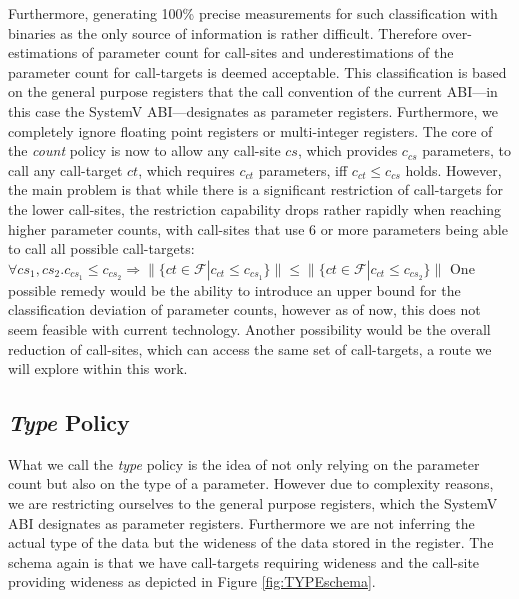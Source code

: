  Furthermore, generating 100\% precise measurements for such classification with binaries as the only source of information is rather difficult. 
 Therefore over-estimations of parameter count for call-sites and underestimations of the parameter count for call-targets is deemed acceptable. 
 This classification is based on the general purpose registers that the call convention of the current ABI---in this case the 
 SystemV ABI---designates as parameter registers. Furthermore, we completely ignore floating point registers or multi-integer registers. 
 The core of the \emph{count} policy is now to allow any call-site $cs$, which provides $c_{cs}$ parameters, to call any call-target $ct$, 
 which requires $c_{ct}$ parameters, iff $c_{ct} \leq c_{cs}$ holds. However, the main problem is that while there is a significant 
 restriction of call-targets for the lower call-sites, the restriction capability drops rather rapidly when reaching higher parameter 
 counts, with call-sites that use 6 or more parameters being able to call all possible call-targets:
$
	\forall cs_1, cs_2.  c_{cs_1} \leq c_{cs_2} \Longrightarrow  \| \{ct \in \mathcal{F} | c_{ct} \leq c_{cs_1} \} \| \leq \| \{ct \in \mathcal{F} | c_{ct} \leq c_{cs_2}  \} \|
$
One possible remedy would be the ability to introduce an upper bound for the classification deviation of parameter counts, 
however as of now, this does not seem feasible with current technology. Another possibility would be the overall reduction
of call-sites, which can access the same set of call-targets, a route we will explore within this work.

\subsection{\emph{Type} Policy}
\label{section:typepolicy}

What we call the \emph{type} policy is the idea of not only relying on the parameter count but also on the type of a parameter. However due to complexity reasons,
we are restricting ourselves to the general purpose registers, which the SystemV ABI designates as parameter registers. Furthermore we are not inferring 
the actual type of the data but the wideness of the data stored in the register. The schema again is that we have call-targets requiring wideness and the
call-site providing wideness as depicted in Figure \ref{fig:TYPEschema}.

